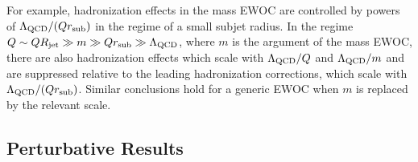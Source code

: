 For example, hadronization effects in the mass EWOC are controlled by powers of \(\Lambda_{\text{QCD}}/(Q r_\text{sub})\) in the regime of a small subjet radius.
%
In the regime \(Q \sim Q R_\text{jet} \gg m \gg Q r_\text{sub} \gg \Lambda_{\text{QCD}}\), where \(m\) is the argument of the mass EWOC, there are also hadronization effects which scale with \(\Lambda_{\text{QCD}}/Q\) and \(\Lambda_{\text{QCD}}/m\) and are suppressed relative to the leading hadronization corrections, which scale with \(\Lambda_{\text{QCD}}/(Q r_\text{sub})\).
%
Similar conclusions hold for a generic EWOC when \(m\) is replaced by the relevant scale.

\subsection{Perturbative Results}
\label{sec:ewoc-perturbative}


